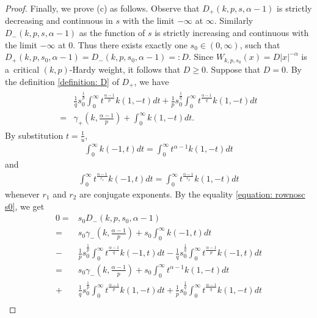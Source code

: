 \documentclass[12pt, a4paper]{amsart}
\begin{document}
\begin{proof}
Finally, we prove (c) as follows. Observe that $D_+(k, p, s, \alpha - 1)$  is strictly decreasing and continuous in $s$ with the limit $-\infty$ at $\infty$. Similarly $D_-(k, p, s, \alpha - 1)$ as the function of $s$ is strictly increasing and continuous with the limit $-\infty$ at $0$. Thus there exists exactly one $s_0 \in (0, \infty)$, such that $D_+(k, p, s_0, \alpha - 1) = D_-(k, p, s_0, \alpha - 1) =: D$. Since $W_{k, p, s_0}(x) = D|x|^{-\alpha}$ is a~critical $(k, p)$-Hardy weight, it follows that $D \geq 0$. Suppose that $D = 0$. By the definition \cref{definition: D} of $D_+$, we have
\begin{align}
\begin{split}
\label{equation: rownosc s0}
    &\frac{1}{q}s_0^{\frac{1}{p}}\int_{0}^{\infty}t^{\frac{\alpha-1}{p}}k\left(1,-t\right)dt+\frac{1}{p}s_0^{\frac{1}{q}}\int_{0}^{\infty}t^{\frac{\alpha-1}{q}}k\left(1,-t\right)dt 
    \\
    =&\gamma_+\left(k, \frac{\alpha-1}{p}\right)+\int_{0}^{\infty}k\left(1,-t\right)dt.
\end{split}
\end{align}
By substitution $t = \frac{1}{u}$,
\begin{align*}
    \int_{0}^{\infty}k\left(-1,t\right)dt = \int_{0}^{\infty}t^{\alpha-1}k\left(1,-t\right)dt
\end{align*}
and
\begin{align}\label{eq:k(-1,t)}
    \int_{0}^{\infty}t^{\frac{\alpha-1}{r_1}}k\left(-1,t\right)dt = \int_{0}^{\infty}t^{\frac{\alpha-1}{r_2}}k\left(1,-t\right)dt
\end{align}
 whenever $r_1$ and $r_2$ are conjugate exponents. By the equality \cref{equation: rownosc s0}, we get
\begin{align*}
    0 = &s_0D_{-}(k, p, s_0, \alpha-1)
    \\
    = &s_0\gamma_-\left(k, \frac{\alpha-1}{p}\right) + s_0\int_0^{\infty}k(-1, t)dt 
    \\
    - &\frac{1}{p}s_0^{\frac{1}{p}}\int_{0}^{\infty}t^{\frac{\alpha-1}{q}}k\left(-1,t\right)dt - \frac{1}{q}s_0^{\frac{1}{q}}\int_{0}^{\infty}t^{\frac{\alpha-1}{p}}k\left(-1,t\right)dt
    \\
    = &s_0\gamma_-\left(k, \frac{\alpha-1}{p}\right) + s_0\int_0^{\infty}t^{\alpha-1}k(1, -t)dt 
    \\
    + &\frac{1}{q}s_0^{\frac{1}{p}}\int_{0}^{\infty}t^{\frac{\alpha-1}{p}}k\left(1,-t\right)dt + \frac{1}{p}s_0^{\frac{1}{q}}\int_{0}^{\infty}t^{\frac{\alpha-1}{q}}k\left(1,-t\right)dt
    \\

\end{align*}
\end{proof}
\end{document}
